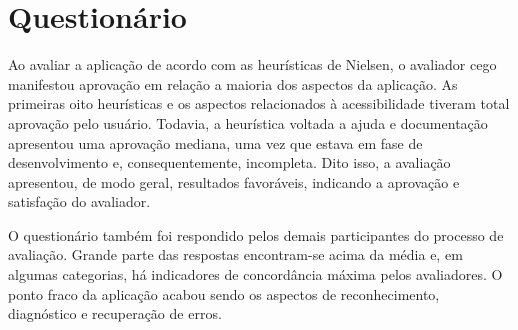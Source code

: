 \section{Questionário}

Ao avaliar a aplicação de acordo com as heurísticas de Nielsen, o avaliador cego manifestou aprovação em relação a maioria dos aspectos da aplicação.  As primeiras oito heurísticas e os aspectos relacionados à acessibilidade tiveram total aprovação pelo usuário. Todavia, a heurística voltada a ajuda e documentação apresentou uma aprovação mediana, uma vez que estava em fase de desenvolvimento e, consequentemente, incompleta. Dito isso, a avaliação apresentou, de modo geral, resultados favoráveis, indicando a aprovação e satisfação do avaliador.

O questionário também foi respondido pelos demais participantes do processo de avaliação. Grande parte das respostas encontram-se acima da média e, em algumas categorias, há indicadores de concordância máxima pelos avaliadores. O ponto fraco da aplicação acabou sendo os aspectos de reconhecimento, diagnóstico e recuperação de erros. 
